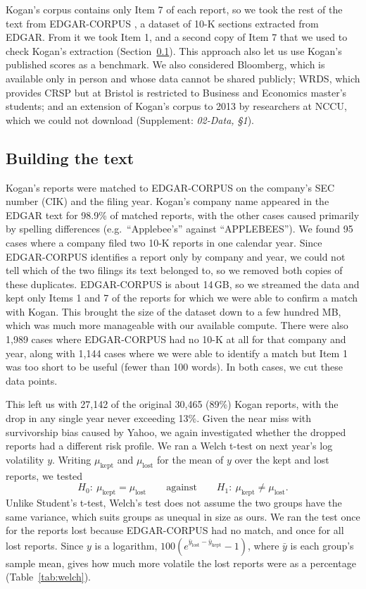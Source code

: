 \documentclass[11pt,a4paper]{article}
\newcommand{\supp}[1]{(Supplement: \textit{#1})}
\begin{document}
Kogan's corpus contains only Item 7 of each report, so we took the rest of the text from EDGAR-CORPUS \citep{loukas2021}, a dataset of 10-K sections extracted from EDGAR. From it we took Item 1, and a second copy of Item 7 that we used to check Kogan's extraction (Section~\ref{sec:data-text}). This approach also let us use Kogan's published scores as a benchmark. We also considered Bloomberg, which is available only in person and whose data cannot be shared publicly; WRDS, which provides CRSP but at Bristol is restricted to Business and Economics master's students; and an extension of Kogan's corpus to 2013 by researchers at NCCU, which we could not download \supp{02-Data, \S1}.

\subsection{Building the text}\label{sec:data-text}
Kogan's reports were matched to EDGAR-CORPUS on the company's SEC number (CIK) and the filing year. Kogan's company name appeared in the EDGAR text for 98.9\% of matched reports, with the other cases caused primarily by spelling differences (e.g.\ ``Applebee's'' against ``APPLEBEES''). We found 95 cases where a company filed two 10-K reports in one calendar year. Since EDGAR-CORPUS identifies a report only by company and year, we could not tell which of the two filings its text belonged to, so we removed both copies of these duplicates. EDGAR-CORPUS is about 14\,GB, so we streamed the data and kept only Items 1 and 7 of the reports for which we were able to confirm a match with Kogan. This brought the size of the dataset down to a few hundred MB, which was much more manageable with our available compute. There were also 1,989 cases where EDGAR-CORPUS had no 10-K at all for that company and year, along with 1,144 cases where we were able to identify a match but Item 1 was too short to be useful (fewer than 100 words). In both cases, we cut these data points.

This left us with 27,142 of the original 30,465 (89\%) Kogan reports, with the drop in any single year never exceeding 13\%. Given the near miss with survivorship bias caused by Yahoo, we again investigated whether the dropped reports had a different risk profile. We ran a Welch t-test on next year's log volatility $y$. Writing $\mu_{\text{kept}}$ and $\mu_{\text{lost}}$ for the mean of $y$ over the kept and lost reports, we tested
\[
H_0:\ \mu_{\text{kept}} = \mu_{\text{lost}}
\qquad \text{against} \qquad
H_1:\ \mu_{\text{kept}} \neq \mu_{\text{lost}}.
\]
Unlike Student's t-test, Welch's test \citep{welch1947} does not assume the two groups have the same variance, which suits groups as unequal in size as ours. We ran the test once for the reports lost because EDGAR-CORPUS had no match, and once for all lost reports. Since $y$ is a logarithm, $100\left(e^{\bar{y}_{\text{lost}} - \bar{y}_{\text{kept}}} - 1\right)$, where $\bar{y}$ is each group's sample mean, gives how much more volatile the lost reports were as a percentage (Table~\ref{tab:welch}).
\end{document}
